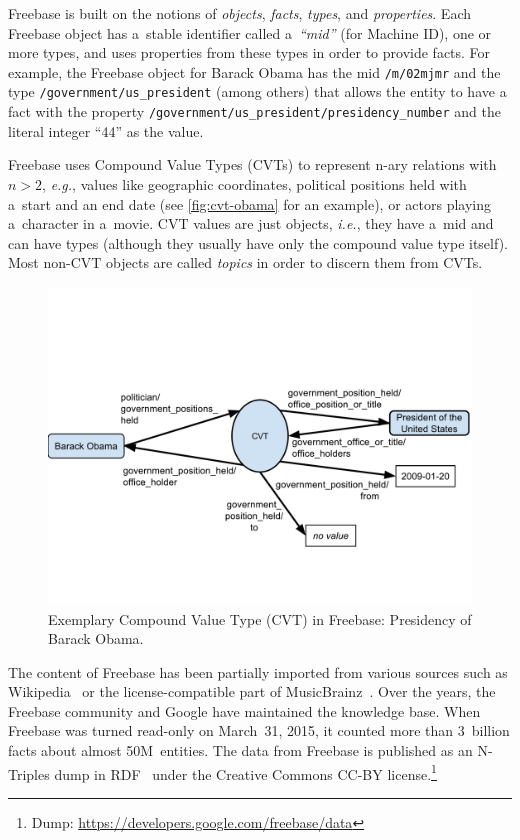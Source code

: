 \documentclass{acm_proc_article-sp}
\begin{document}
Freebase is built on the notions of \emph{objects}, \emph{facts}, \emph{types}, and \emph{properties}.
Each Freebase object has a~stable identifier called a~\emph{``mid''} (for Machine ID),
one or more types, and uses properties from these types in order to provide facts.
For example, the Freebase object for Barack Obama has the mid \texttt{/m/02mjmr}
and the type \texttt{/government/us\_president} (among others) that allows the entity to have
a fact with the property \texttt{/government/us\_president/presidency\_number} \linebreak
and the literal integer ``44'' as the value.

Freebase uses Compound Value Types (CVTs) to represent
n-ary relations with $n>2$, \emph{e.g.}, values like geographic coordinates,
political positions held with a~start and an end date (see \autoref{fig:cvt-obama} for an example),
or actors playing a~character in a~movie.
CVT values are just objects, \emph{i.e.}, they have a~mid and can have types
(although they usually have only the compound value type itself).
Most non-CVT objects are called \emph{topics} in order to discern them from CVTs.

\begin{figure}[!htbp]
  \centering
  \includegraphics[trim=0cm 3cm 0cm 5cm, width=8.45 cm]{img/freebase-cvt-obama.pdf}
  \caption{Exemplary Compound Value Type (CVT) in Freebase: Presidency of Barack Obama.}
  \label{fig:cvt-obama}
\end{figure}

The content of Freebase has been partially imported from various sources
such as Wikipedia~\cite{wikipedia-works} or
the license-compa\-tible part of MusicBrainz~\cite{musicbrainz}.
Over the years, the Freebase community and Google have maintained the knowledge base.
When Freebase was turned read-only on March~31, 2015,
it counted more than 3~billion facts about almost 50M~entities.
The data from Freebase is published as an N-Triples dump in RDF~\cite{rdf} under
the Creative Commons CC-BY license.\footnote{Dump: \url{https://developers.google.com/freebase/data}}
\end{document}
